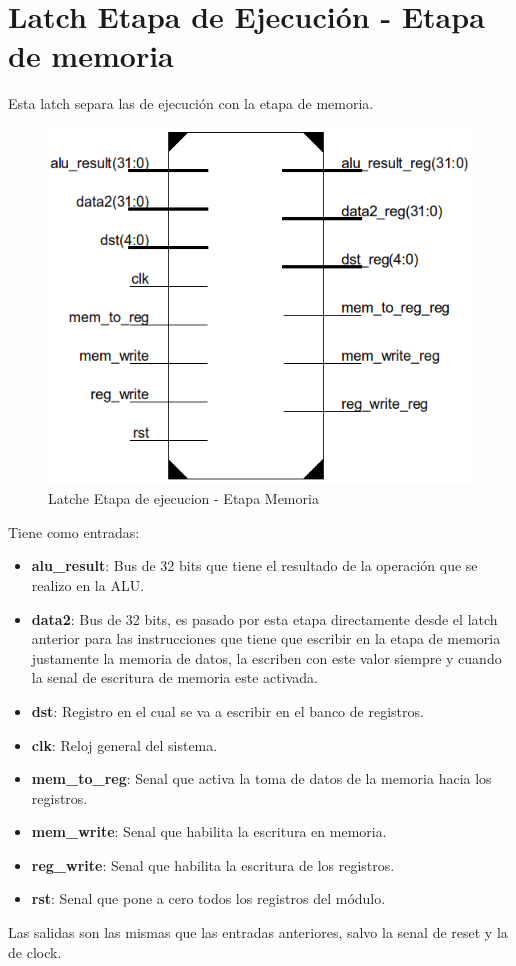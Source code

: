\section{Latch Etapa de Ejecuci\'on - Etapa de memoria}

Esta latch separa las de ejecuci\'on con la etapa de memoria.
\begin{figure}[H]
\centering
\includegraphics[scale=0.35]{img/latch_ex_m}
\caption{Latche Etapa de ejecucion - Etapa Memoria}
\label{fig:latch_ex_mem}
\end{figure}
Tiene como entradas:
\begin{itemize}
  \item \textbf{alu\_result}: Bus de 32 bits que tiene el resultado de la operaci\'on que se realizo en la ALU.
  \item \textbf{data2}: Bus de 32 bits, es pasado por esta etapa directamente desde el latch anterior para las instrucciones que tiene que escribir en la etapa de memoria justamente la memoria de datos, la escriben con este valor siempre y cuando la senal de escritura de memoria este activada.
  \item \textbf{dst}: Registro en el cual se va a escribir en el banco de registros.
  \item \textbf{clk}: Reloj general del sistema.
  \item \textbf{mem\_to\_reg}: Senal que activa la toma de datos de la memoria hacia los registros.
  \item \textbf{mem\_write}: Senal que habilita la escritura en memoria.
  \item \textbf{reg\_write}: Senal que habilita la escritura de los registros.
  \item \textbf{rst}: Senal que pone a cero todos los registros del m\'odulo.
\end{itemize}

Las salidas son las mismas que las entradas anteriores, salvo la senal de reset y la de clock.